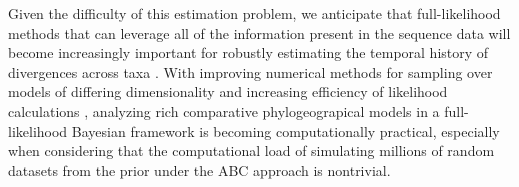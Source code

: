 Given the difficulty of this estimation problem, we anticipate that
full-likelihood methods that can leverage all of the information present in the
sequence data will become increasingly important for robustly estimating the
temporal history of divergences across taxa \citep{JeetDiss}.
With improving numerical methods for sampling over models of differing
dimensionality \citep{Green1995,Lemey2009} and increasing efficiency of
likelihood calculations \citep{Ayres2012}, analyzing rich comparative
phylogeograpical models in a full-likelihood Bayesian framework is becoming
computationally practical, especially when considering that the computational
load of simulating millions of random datasets from the prior under the ABC
approach is nontrivial.

